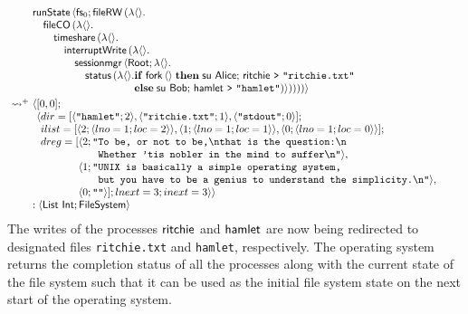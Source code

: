 \documentclass[12pt,phd,lfcs,twoside,openright,logo,leftchapter,normalheadings]{infthesis}
\theoremstyle{plain}
\theoremstyle{definition}
\begin{document}
\[
  \ba{@{~}l@{~}l}
    &\bl
    \runState\,\Record{\dec{fs}_0;\fileRW\,(\lambda\Unit.\\
         \quad\fileAlloc\,(\lambda\Unit.\\
         \qquad\timeshare\,(\lambda\Unit.\\
         \qquad\quad\dec{interruptWrite}\,(\lambda\Unit.\\
         \qquad\qquad\sessionmgr\,\Record{\Root;\lambda\Unit.\\
         \qquad\qquad\quad\status\,(\lambda\Unit.
                 \ba[t]{@{}l}
                   \If\;\fork\,\Unit\;\Then\;
                       \su~\Alice;\,
                       \quoteRitchie~\redirect~\strlit{ritchie.txt}\\
                   \Else\;
                       \su~\Bob;\,
                       \quoteHamlet~\redirect~\strlit{hamlet})}))))}
                 \ea
     \el \smallskip\\
     \reducesto^+&
     \bl
      \Record{
       \ba[t]{@{}l}
       [0, 0];\\
       \Record{
         \ba[t]{@{}l}
           dir=[\Record{\strlit{hamlet};2},
                \Record{\strlit{ritchie.txt};1},
                \Record{\strlit{stdout};0}];\\
           ilist=[\Record{2;\Record{lno=1;loc=2}},
                  \Record{1;\Record{lno=1;loc=1}},
                  \Record{0;\Record{lno=1;loc=0}}];\\
           dreg=[
             \ba[t]{@{}l}
               \Record{2;
                 \ba[t]{@{}l@{}l}
                   \texttt{"}&\texttt{To be, or not to be,\nl{}that is the question:\nl{}}\\
                             &\texttt{Whether 'tis nobler in the mind to suffer\nl{}"}},
                 \ea\\
               \Record{1;
                 \ba[t]{@{}l@{}l}
                   \texttt{"}&\texttt{UNIX is basically a simple operating system, }\\
                             &\texttt{but you have to be a genius to understand the simplicity.\nl{"}}},
                 \ea\\
                 \Record{0; \strlit{}}]; lnext=3; inext=3}}\\
           \ea
         \ea
       \ea\\
       : \Record{\List~\Int; \FileSystem}
     \el
  \ea
\]
%
The writes of the processes $\mathsf{ritchie}$ and $\mathsf{hamlet}$ are now
being redirected to designated files \texttt{ritchie.txt} and
\texttt{hamlet}, respectively. The operating system returns the
completion status of all the processes along with the current state of
the file system such that it can be used as the initial file system
state on the next start of the operating system.
\end{document}
